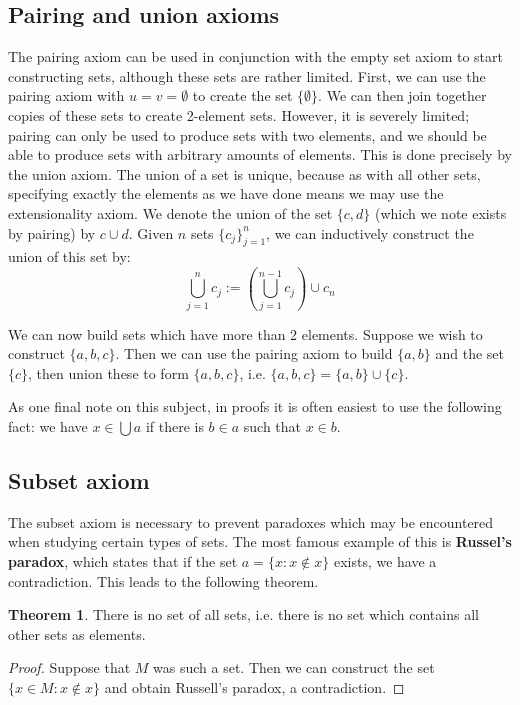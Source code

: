 \documentclass[11pt, oneside]{article}   	%
\theoremstyle{definition}
\newtheorem{theorem}{Theorem}[section]
\begin{document}
\subsection{Pairing and union axioms}

The pairing axiom can be used in conjunction with the empty set axiom to start constructing sets, although these sets are rather 
limited. First, we can use the pairing axiom with $u = v = \emptyset$ to create the set $\{\emptyset\}$. We can then join together 
copies of these sets to create 2-element sets. However, it is severely limited; pairing can only be used to produce sets with 
two elements, and we should be able to produce sets with arbitrary amounts of elements. This is done precisely by the union 
axiom. The union of a set is unique, because as with all other sets, specifying exactly the elements as we have done means 
we may use the extensionality axiom. We denote the union of the set $\{c, d\}$ (which we note exists by pairing) by $c\cup d$. 
Given $n$ sets $\{c_j\}_{j = 1}^n$, we can inductively construct the union of this set by:
\begin{equation}
	\bigcup_{j = 1}^n c_j := \left(\bigcup_{j = 1}^{n - 1} c_j\right)\cup c_n
\end{equation}

We can now build sets which have more than 2 elements. Suppose we wish to construct $\{a, b, c\}$. Then we can use the 
pairing axiom to build $\{a, b\}$ and the set $\{c\}$, then union these to form $\{a, b, c\}$, i.e. $\{a, b, c\} = \{a, b\}\cup\{c\}$. 

As one final note on this subject, in proofs it is often easiest to use the following fact: we have $x\in\bigcup a$ if there is $b\in a$ 
such that $x\in b$. 

\subsection{Subset axiom}

The subset axiom is necessary to prevent paradoxes which may be encountered when studying certain types of sets. The 
most famous example of this is \textbf{Russel's paradox}, which states that if the set $a = \{x : x\notin x\}$ exists, we have a 
contradiction. This leads to the following theorem. 
\begin{theorem}
	There is no set of all sets, i.e. there is no set which contains all other sets as elements.
\end{theorem}
\begin{proof}
	Suppose that $M$ was such a set. Then we can construct the set $\{x\in M : x\notin x\}$ and obtain Russell's paradox, 
	a contradiction. 
\end{proof}
\end{document}
